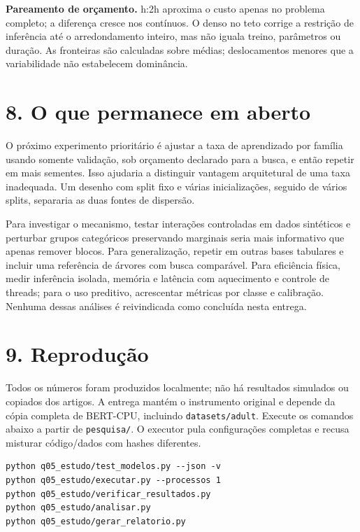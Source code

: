 \documentclass[10pt,a4paper]{article}
\begin{document}
\textbf{Pareamento de orçamento.} h:2h aproxima o custo apenas no problema completo; a diferença cresce nos contínuos. O denso no teto corrige a restrição de inferência até o arredondamento inteiro, mas não iguala treino, parâmetros ou duração. As fronteiras são calculadas sobre médias; deslocamentos menores que a variabilidade não estabelecem dominância.


\section*{8. O que permanece em aberto}
O próximo experimento prioritário é ajustar a taxa de aprendizado por família usando somente validação, sob orçamento declarado para a busca, e então repetir em mais sementes. Isso ajudaria a distinguir vantagem arquitetural de uma taxa inadequada. Um desenho com split fixo e várias inicializações, seguido de vários splits, separaria as duas fontes de dispersão.


Para investigar o mecanismo, testar interações controladas em dados sintéticos e perturbar grupos categóricos preservando marginais seria mais informativo que apenas remover blocos. Para generalização, repetir em outras bases tabulares e incluir uma referência de árvores com busca comparável. Para eficiência física, medir inferência isolada, memória e latência com aquecimento e controle de threads; para o uso preditivo, acrescentar métricas por classe e calibração. Nenhuma dessas análises é reivindicada como concluída nesta entrega.


\clearpage

\section*{9. Reprodução}
Todos os números foram produzidos localmente; não há resultados simulados ou copiados dos artigos. A entrega mantém o instrumento original e depende da cópia completa de BERT-CPU, incluindo \texttt{datasets/\allowbreak{}adult}. Execute os comandos abaixo a partir de \texttt{pesquisa/\allowbreak{}}. O executor pula configurações completas e recusa misturar código/dados com hashes diferentes.


{\small
\begin{verbatim}
python q05_estudo/test_modelos.py --json -v
python q05_estudo/executar.py --processos 1
python q05_estudo/verificar_resultados.py
python q05_estudo/analisar.py
python q05_estudo/gerar_relatorio.py
\end{verbatim}
}
\end{document}
